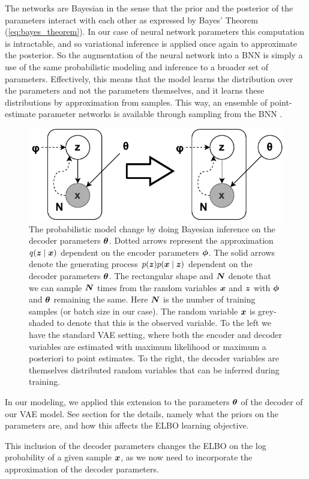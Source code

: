 The networks are Bayesian in the sense that the prior and the posterior of the parameters interact with each other as expressed by Bayes' Theorem (\ref{eq:bayes_theorem}). In our case of neural network parameters this computation is intractable, and so variational inference is applied once again to approximate the posterior. So the augmentation of the neural network into a BNN is simply a use of the same probabilistic modeling and inference to a broader set of parameters. Effectively, this means that the model learns the distribution over the parameters and not the parameters themselves, and it learns these distributions by approximation from samples. This way, an ensemble of point-estimate parameter networks is available through sampling from the BNN \cite{blundell2015weight}.
\begin{figure}[H]
    \centering
    \includegraphics{report/figures/BNN.pdf}
    \caption{The probabilistic model change by doing Bayesian inference on the decoder parameters $\bm{ \theta }$. Dotted arrows represent the approximation $q(\bm{ z } \mid \bm{ x })$ dependent on the encoder parameters $\bm{ \phi }$. The solid arrows denote the generating process $p(\bm{ z }) p(\bm{ x } \mid \bm{ z })$ dependent on the decoder parameters $\bm{ \theta }$. The rectangular shape and $\bm{ N }$ denote that we can sample $\bm{ N }$ times from the random variables $\bm{ x }$ and $\bm{ z }$ with $\bm{ \phi }$ and $\bm{ \theta }$ remaining the same. Here $\bm{ N }$ is the number of training samples (or batch size in our case). The random variable $\bm{ x }$ is grey-shaded to denote that this is the observed variable. To the left we have the standard VAE setting, where both the encoder and decoder variables are estimated with maximum likelihood or maximum a posteriori to point estimates. To the right, the decoder variables are themselves distributed random variables that can be inferred during training.}
    \label{fig:bnn}
\end{figure}

In our modeling, we applied this extension to the parameters $\bm{ \theta }$ of the decoder of our VAE model. See section  for the details, namely what the priors on the parameters are, and how this affects the ELBO learning objective.

This inclusion of the decoder parameters changes the ELBO on the log probability of a given sample $\bm{ x }$, as we now need to incorporate the approximation of the decoder parameters. 

